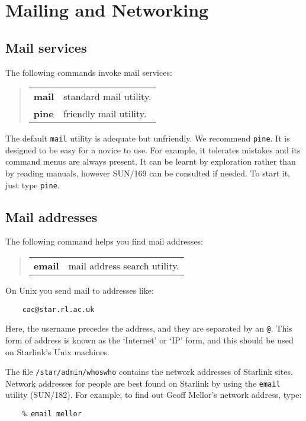 \documentclass[twoside,11pt]{article}
\newcommand{\xref}[3]{#1}
\begin{document}
\newpage

\section{Mailing and Networking\label{Mail}}

\subsection{Mail services}

The following commands invoke mail services:
\begin{quote}
\begin{tabular}{lp{67mm}}

{\bf mail}  & standard mail utility.\\
{\bf pine}  & friendly mail utility.

\end{tabular}
\end{quote}
The default {\tt mail} utility is adequate but unfriendly.
We recommend {\tt pine}.
It is designed to be easy for a novice to use.
For example, it tolerates mistakes and its command menus are always present.
It can be learnt by exploration rather than by reading manuals, however
\xref{SUN/169}{sun169}{} can be consulted if needed.
To start it, just type {\tt pine}.

\subsection{Mail addresses}

The following command helps you find mail addresses:
\begin{quote}
\begin{tabular}{lp{67mm}}

{\bf email}  & mail address search utility.

\end{tabular}
\end{quote}
On Unix you send mail to addresses like:
\begin{verbatim}
    cac@star.rl.ac.uk
\end{verbatim}
Here, the username precedes the address, and they are separated
by an {\tt @}.
This form of address is known as the `Internet' or `IP' form, and this
should be used on Starlink's Unix machines. 

The file {\tt /star/admin/whoswho} contains the network addresses of Starlink
sites.
Network addresses for people are best found on Starlink by using the
{\tt email} utility
(\xref{SUN/182}{sun182}{}).
For example, to find out Geoff Mellor's network address, type:
\begin{verbatim}
    % email mellor
\end{verbatim}
\end{document}
